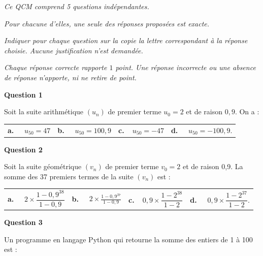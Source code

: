 \medskip

\emph{Ce QCM comprend 5 questions indépendantes.}

\emph{Pour chacune d'elles, une seule des réponses proposées est exacte.}
 
\emph{Indiquer pour chaque question sur la copie la lettre correspondant à la réponse
choisie. Aucune justification n'est demandée.}

\emph{Chaque réponse correcte rapporte $1$ point. Une réponse incorrecte ou une absence de
réponse n'apporte, ni ne retire de point.}

\medskip

 \textbf{Question 1}

 \medskip

 Soit la suite arithmétique $\left(u_n\right)$ de premier terme $u_0 = 2$ et de raison $0,9$. On a :
\begin{center}
\begin{tabularx}{\linewidth}{*{4}{X}}
\textbf{a.~~} $u_{50}= 47$ &\textbf{b.~~} $u_{50}= 100,9$&\textbf{c.~~}$u_{50}= -47$& \textbf{d.~~} $u_{50}= -100,9$.
\end{tabularx}
\end{center}

\medskip

 \textbf{Question 2}

\medskip

Soit la suite géométrique $\left(v_n\right)$ de premier terme $v_0 = 2$ et de raison 0,9.
La somme des 37 premiers termes de la suite $\left(v_n\right)$ est :

\medskip

\begin{tabularx}{\linewidth}{*{4}{X}}
\textbf{a.~~} $2 \times \dfrac{1-0,9^{38}}{1-0,9}$ &\textbf{b.~~} $2\times \frac{1-0,9^{37}}{1- 0,9}$&\textbf{c.~~}$ 0,9\times \dfrac{1-2^{38}}{1-2}$& \textbf{d.~~} $0,9 \times \dfrac{1-2^{37}}{1-2}$.
\end{tabularx}

\medskip

\textbf{Question 3}

 \medskip
 Un programme en langage Python qui retourne la somme des entiers de 1 à 100 est :
 
 \medskip

